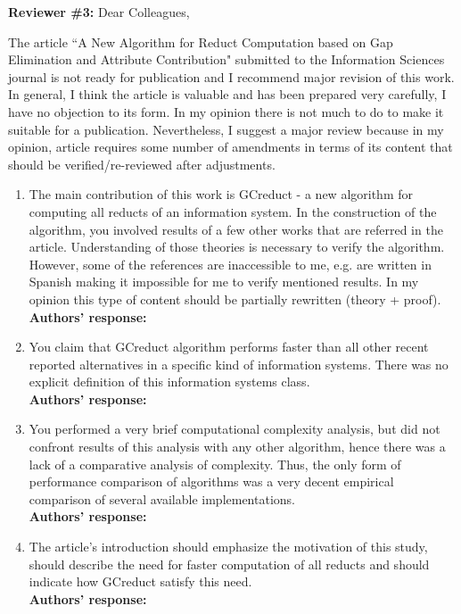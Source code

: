 \documentclass{letter}
\begin{document}
\begin{letter}{}
  \textbf{Reviewer \#3:} Dear Colleagues,
  
  The article ``A New Algorithm for Reduct Computation based on Gap Elimination and Attribute Contribution" submitted to the Information Sciences journal is not ready for publication and I recommend major revision of this work. In general, I think the article is valuable and has been prepared very carefully, I have no objection to its form. In my opinion there is not much to do to make it suitable for a publication. Nevertheless, I suggest a major review because in my opinion, article requires some number of amendments in terms of its content that should be verified/re-reviewed after adjustments.  
  
  \begin{enumerate}
	  \item The main contribution of this work is GCreduct - a new algorithm for computing all reducts of an information system. In the construction of the algorithm, you involved results of a few other works that are referred in the article.  Understanding of those theories is necessary to verify the algorithm. However, some of the references are inaccessible  to me, e.g. are written in Spanish making it impossible for me to verify mentioned results. In my opinion this type of content should be partially rewritten (theory + proof).\\
	  \textbf{Authors’ response:}  

	  \item You claim that GCreduct algorithm performs faster than all other recent reported alternatives in a specific kind of information systems. There was no explicit definition of this information systems class.\\
	  \textbf{Authors’ response:} 

	  \item You performed a very brief computational complexity analysis, but did not confront results of this analysis with any other algorithm, hence there was a lack of a comparative analysis of complexity. Thus, the only form of performance comparison of algorithms was a very decent empirical comparison of several available implementations.\\
	  \textbf{Authors’ response:} 

	  \item The article's introduction should emphasize the motivation of this study, should describe the need for faster computation of all reducts and should indicate how GCreduct satisfy this need.\\
	  \textbf{Authors’ response:} 
	  

\end{enumerate}
\end{letter}
\end{document}

